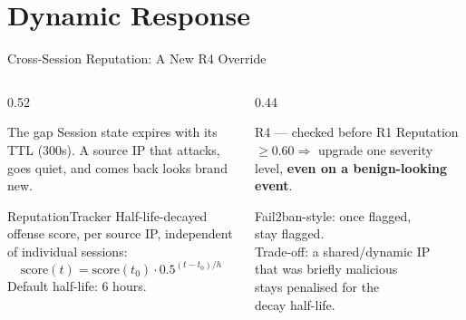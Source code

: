 \documentclass[aspectratio=169, 12pt]{beamer}
\begin{document}
\section{Dynamic Response}

\begin{frame}{Cross-Session Reputation: A New R4 Override}
  \begin{columns}[T]
    \begin{column}{0.52\textwidth}
      \begin{block}{The gap}
        Session state expires with its TTL (300s). A source IP that
        attacks, goes quiet, and comes back looks brand new.
      \end{block}
      \vspace{0.2cm}
      \begin{exampleblock}{ReputationTracker}
        Half-life-decayed offense score, per source IP, independent of
        individual sessions:
        \[
          \text{score}(t) = \text{score}(t_0)\cdot 0.5^{(t-t_0)/h}
        \]
        Default half-life: 6 hours.
      \end{exampleblock}
    \end{column}
    \begin{column}{0.44\textwidth}
      \begin{alertblock}{R4 — checked before R1}
        Reputation $\geq 0.60 \Rightarrow$ upgrade one severity level,
        \textbf{even on a benign-looking event}.
      \end{alertblock}
      \vspace{0.2cm}
      \begin{center}
        \small\textcolor{honeygrey}{Fail2ban-style: once flagged,\\ stay flagged.\\[4pt]
        Trade-off: a shared/dynamic IP\\ that was briefly malicious\\
        stays penalised for the\\ decay half-life.}
      \end{center}
    \end{column}
  \end{columns}
\end{frame}
\end{document}
